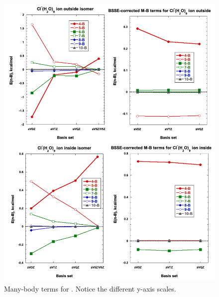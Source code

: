 \begin{figure}[H]
    \centering
    \includegraphics[width=.9\textwidth]{Figures/Chapter_3/figure_8_combined.png}
  \caption[Many-body terms for .]{Many-body terms for . Notice the different y-axis scales.}
  \label{fig:MBE_II_8}
\end{figure}